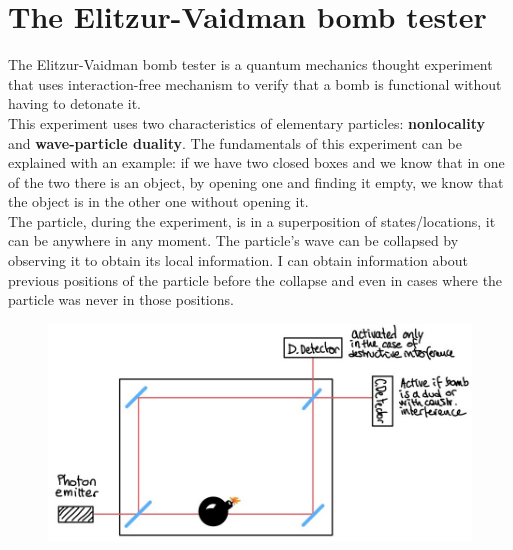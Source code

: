 \section{The Elitzur-Vaidman bomb tester}
The Elitzur-Vaidman bomb tester is a quantum mechanics thought experiment that uses interaction-free mechanism to verify that a bomb is functional without having to detonate it. \\
This experiment uses two characteristics of elementary particles: \textbf{nonlocality} and \textbf{wave-particle duality}. The fundamentals of this experiment can be explained with an example: if we have two closed boxes and we know that in one of the two there is an object, by opening one and finding it empty, we know that the object is in the other one without opening it.\\
The particle, during the experiment, is in a superposition of states/locations, it can be anywhere in any moment. The particle's wave can be collapsed by observing it to obtain its local information. I can obtain information about previous positions of the particle before the collapse and even in cases where the particle was never in those positions.\\
\begin{figure}[htbp!]
	\centering
	\includegraphics[scale=0.30]{img_12}
\end{figure}


